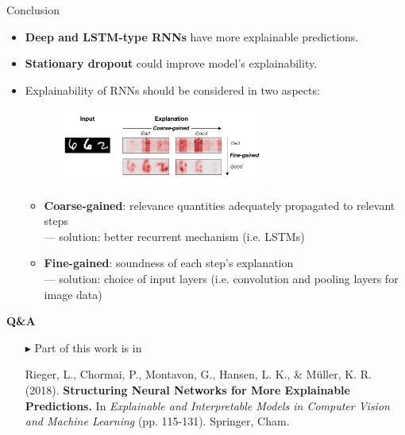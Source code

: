 \documentclass[Nike]{tuberlinbeamer}
\begin{document}
\begin{frame}{Conclusion}

\begin{itemize}
	\item \textbf{Deep and LSTM-type RNNs} have more explainable predictions.
	\item \textbf{Stationary dropout} could improve model's explainability.
	\item Explainability of RNNs should be considered in two aspects:
	 \begin{figure}[h]
	\includegraphics [width=0.65\textwidth]{figures/present_coarse_fine_aspects}
\end{figure}
		\begin{itemize}
			\item \textbf{Coarse-gained}: relevance quantities adequately propagated to relevant steps \\
					--- solution: better recurrent mechanism (i.e. LSTMs)
			\item \textbf{Fine-gained}: soundness of each step's explanation\\
					--- solution: choice of input layers (i.e. convolution and pooling layers for image data)
		\end{itemize}
\end{itemize}
\end{frame}


\begin{frame}{}
\vfill 
\begin{center}
\LARGE \textbf{Q\&A}	
\end{center}

\vfill


\begin{itemize}
	\item[$\blacktriangleright$] Part of this work is in \\
{ \small \vspace{0.2cm}

Rieger, L., Chormai, P., Montavon, G., Hansen, L. K., \& Müller, K. R. (2018). \textbf{Structuring Neural Networks for More Explainable Predictions.} In \textit{Explainable and Interpretable Models in Computer Vision and Machine Learning} (pp. 115-131). Springer, Cham.
} 
\end{itemize}


\end{frame}
\end{document}
